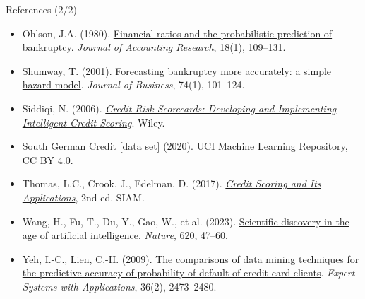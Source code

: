 \begin{frame}{References (2/2)}
\begin{itemize}
    \item Ohlson, J.A. (1980). \href{https://doi.org/10.2307/2490395}{Financial ratios and the probabilistic prediction of bankruptcy}. \textit{Journal of Accounting Research}, 18(1), 109--131.
    \item Shumway, T. (2001). \href{https://doi.org/10.1086/209665}{Forecasting bankruptcy more accurately: a simple hazard model}. \textit{Journal of Business}, 74(1), 101--124.
    \item Siddiqi, N. (2006). \href{https://doi.org/10.1002/9781119201731}{\textit{Credit Risk Scorecards: Developing and Implementing Intelligent Credit Scoring}}. Wiley.
    \item South German Credit [data set] (2020). \href{https://doi.org/10.24432/C5QG88}{UCI Machine Learning Repository}, CC BY 4.0.
    \item Thomas, L.C., Crook, J., Edelman, D. (2017). \href{https://doi.org/10.1137/1.9781611974560}{\textit{Credit Scoring and Its Applications}}, 2nd ed. SIAM.
    \item Wang, H., Fu, T., Du, Y., Gao, W., et al. (2023). \href{https://doi.org/10.1038/s41586-023-06221-2}{Scientific discovery in the age of artificial intelligence}. \textit{Nature}, 620, 47--60.
    \item Yeh, I.-C., Lien, C.-H. (2009). \href{https://doi.org/10.1016/j.eswa.2007.12.020}{The comparisons of data mining techniques for the predictive accuracy of probability of default of credit card clients}. \textit{Expert Systems with Applications}, 36(2), 2473--2480.
\end{itemize}
\end{frame}


